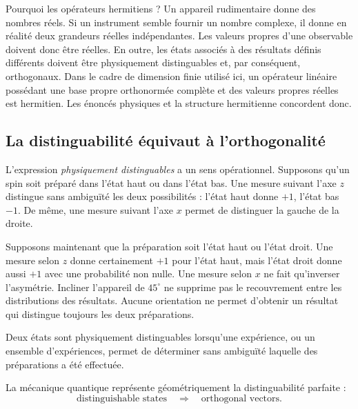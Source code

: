 Pourquoi les opérateurs hermitiens ? Un appareil rudimentaire donne des nombres réels. Si un instrument semble fournir un nombre complexe, il donne en réalité deux grandeurs réelles indépendantes. Les valeurs propres d’une observable doivent donc être réelles. En outre, les états associés à des résultats définis différents doivent être physiquement distinguables et, par conséquent, orthogonaux. Dans le cadre de dimension finie utilisé ici, un opérateur linéaire possédant une base propre orthonormée complète et des valeurs propres réelles est hermitien. Les énoncés physiques et la structure hermitienne concordent donc.

\subsection{La distinguabilité équivaut à l’orthogonalité}

L’expression \emph{physiquement distinguables} a un sens opérationnel. Supposons qu’un spin soit préparé dans l’état haut ou dans l’état bas. Une mesure suivant l’axe \(z\) distingue sans ambiguïté les deux possibilités : l’état haut donne \(+1\), l’état bas \(-1\). De même, une mesure suivant l’axe \(x\) permet de distinguer la gauche de la droite.

Supposons maintenant que la préparation soit l’état haut ou l’état droit. Une mesure selon \(z\) donne certainement \(+1\) pour l’état haut, mais l’état droit donne aussi \(+1\) avec une probabilité non nulle. Une mesure selon \(x\) ne fait qu’inverser l’asymétrie. Incliner l’appareil de \(45^\circ\) ne supprime pas le recouvrement entre les distributions des résultats. Aucune orientation ne permet d’obtenir un résultat qui distingue toujours les deux préparations.

\begin{definition}
Deux états sont physiquement distinguables lorsqu’une expérience, ou un ensemble d’expériences, permet de déterminer sans ambiguïté laquelle des préparations a été effectuée.
\end{definition}

La mécanique quantique représente géométriquement la distinguabilité parfaite :
\begin{equation}
\text{distinguishable states}
\quad\Longrightarrow\quad
\text{orthogonal vectors}.
\end{equation}

\begin{classroomqa}
\end{classroomqa}

